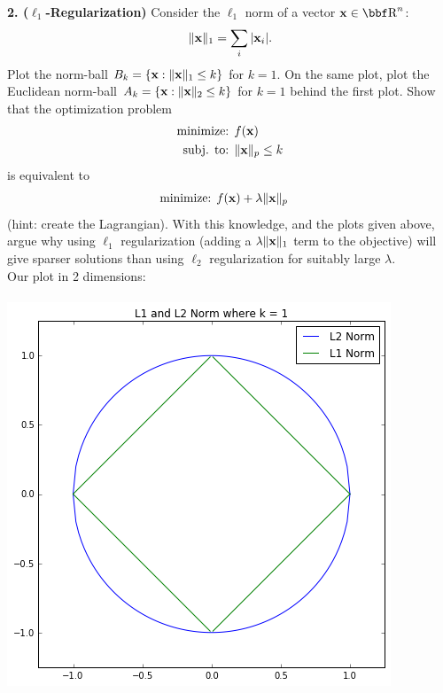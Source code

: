 \documentclass[12pt,letterpaper,fleqn]{hmcpset}
\begin{document}
\newpage

\textbf{2. ($\ell_1$-Regularization)} Consider the $\ell_1$ norm of a vector $\xx\in\RR^n$:
\[
    \|{\bf x}\|_1 = \sum_i |{\bf x}_i|.
\]
Plot the norm-ball $B_k = \{{\bf x} : \|{\bf x}\|_1 \leq k\}$ for $k=1$. On the same plot, plot
the Euclidean norm-ball $A_k = \{{\bf x} : \|{\bf x}\|_2 \leq k\}$ for $k=1$ behind the first plot.
Show that the optimization problem
\begin{align*}
    \text{minimize: } & f({\bf x})\\
    \text{subj. to: } & \|{\bf x}\|_p \leq k
\end{align*}
is equivalent to
\begin{align*}
    \text{minimize: } & f({\bf x}) + \lambda\|{\bf x}\|_p
\end{align*}
(hint: create the Lagrangian). With this knowledge, and the plots given above, argue why
using $\ell_1$ regularization (adding a $\lambda\|{\bf x}\|_1$ term to the objective) will give
sparser solutions than using $\ell_2$ regularization for suitably large $\lambda$.\\[1em]

Our plot in 2 dimensions:\\\\
\includegraphics[scale = .5]{p2.png}\\
\end{document}
